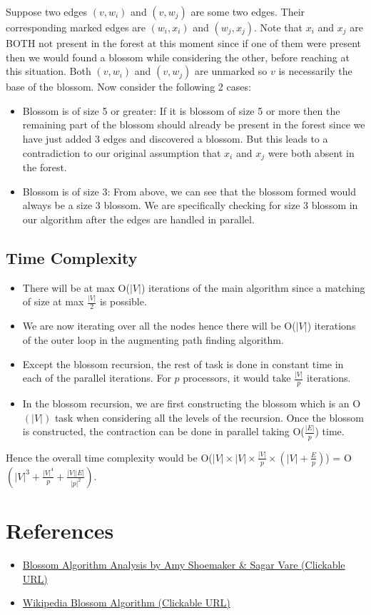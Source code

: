 \documentclass{article}
\begin{document}
Suppose two edges $(v, w_i)$ and $(v, w_j)$ are some two edges. Their corresponding marked edges are $(w_i, x_i)$ and $(w_j, x_j)$. Note that $x_i$ and $x_j$ are BOTH not present in the forest at this moment since if one of them were present then we would found a blossom while considering the other, before reaching at this situation. Both $(v, w_i)$ and $(v, w_j)$ are unmarked so $v$ is necessarily the base of the blossom. Now consider the following 2 cases:
\begin{itemize}
    \item Blossom is of size 5 or greater: If it is blossom of size 5 or more then the remaining part of the blossom should already be present in the forest since we have just added 3 edges and discovered a blossom. But this leads to a contradiction to our original assumption that $x_i$ and $x_j$ were both absent in the forest.
    \item Blossom is of size 3: From above, we can see that the blossom formed would always be a size 3 blossom. We are specifically checking for size 3 blossom in our algorithm after the edges are handled in parallel.
\end{itemize}

\subsection{Time Complexity}
\begin{itemize}
    \item There will be at max O($|V|$) iterations of the main algorithm since a matching of size at max $\frac{|V|}{2}$ is possible.
    \item We are now iterating over all the nodes hence there will be O($|V|$) iterations of the outer loop in the augmenting path finding algorithm. 
    \item Except the blossom recursion, the rest of task is done in constant time in each of the parallel iterations. For $p$ processors, it would take $\frac{|V|}{p}$ iterations. 
    \item In the blossom recursion, we are first constructing the blossom which is an O$(|V|)$ task when considering all the levels of the recursion. Once the blossom is constructed, the contraction can be done in parallel taking O($\frac{|E|}{p}$) time.
\end{itemize}
Hence the overall time complexity would be O($|V| \times |V| \times \frac{|V|}{p} \times (|V|+\frac{E}{p})$) = O$(|V|^3 + \frac{|V|^4}{p} + \frac{|V||E|}{|p|^2})$.

\section{References}
\begin{itemize}
    \item \href{https://stanford.edu/~rezab/classes/cme323/S16/projects_reports/shoemaker_vare.pdf}{\color{blue} Blossom Algorithm Analysis by Amy Shoemaker \& Sagar Vare (Clickable URL)}
    \item \href{https://en.wikipedia.org/wiki/Blossom_algorithm}{\color{blue} Wikipedia Blossom Algorithm (Clickable URL)}
\end{itemize}
\end{document}
